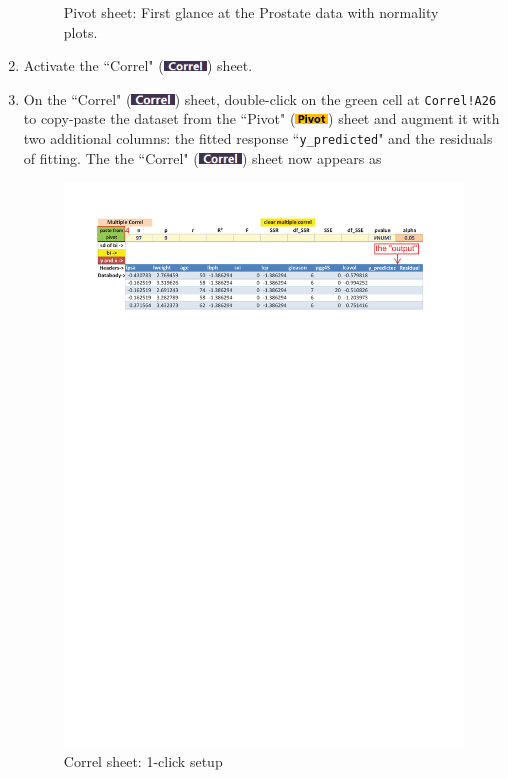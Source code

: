 \documentclass[article]{jss}
\newcommand{\shtPivot}{``Pivot" (\includegraphics[height=8pt, keepaspectratio=true]{PivotSheetTab_png}) }
\newcommand{\shtCorrel}{``Correl" (\includegraphics[height=8pt, keepaspectratio=true]{CorrelSheetTab_png}) }
\begin{document}
\begin{enumerate}
\begin{figure}[!tbh]
                \centering{}\protect\caption{Pivot sheet: First glance at the Prostate data with normality plots.}
          \end{figure}
          \item Activate the \shtCorrel sheet.
          \item On the \shtCorrel sheet, double-click on the green cell at \texttt{Correl!A26} to copy-paste the dataset from the \shtPivot sheet and augment it with two additional columns: the fitted response ``\texttt{y\_predicted}" and the residuals of fitting. The the \shtCorrel sheet now appears as
          \begin{figure}[!tbh]
            \includegraphics[width=\linewidth, keepaspectratio=true]{img/CorrelSheetAfterPaste_markup}
            \centering{}\protect\caption{Correl sheet: 1-click setup}\label{fig:Correl sheet: 1-click setup}
          \end{figure}

\end{enumerate}
\end{document}
